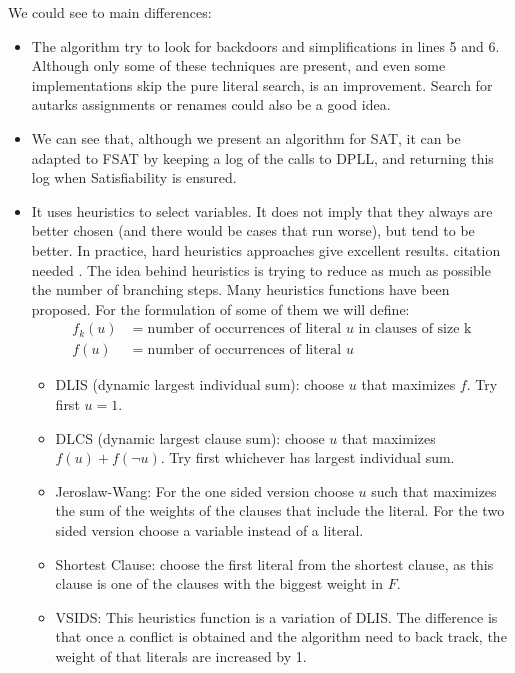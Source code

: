 We could see to main differences:
\begin{itemize}
\item The algorithm try to look for backdoors and simplifications in lines 5 and 6. Although only some of these techniques are present, and even some implementations skip the pure  literal search, is an improvement. Search for autarks assignments or renames could also be a good idea.

\item We can see that, although we present an algorithm for SAT, it can be adapted to FSAT by keeping a log of the calls to DPLL, and returning this log when Satisfiability is ensured.
  
\item It uses heuristics to select variables. It does not imply that they always are better chosen  (and there would be cases that run worse), but tend to be better. In practice, hard heuristics approaches give excellent results. {\color{red} citation needed }. The idea behind heuristics is trying to reduce as much as possible the number of branching steps. Many heuristics functions have been proposed. For the formulation of some of them we will define:
  \begin{equation}
    \begin{split}
      f_k(u) & = \text{number of occurrences of literal } u \text{ in clauses of size k}\\
      f(u) & = \text{number of occurrences of literal } u
\end{split}
\end{equation}
  
  \begin{itemize}
  \item DLIS (dynamic largest individual sum): choose $u$ that maximizes $f$. Try first $u=1$.
  \item DLCS (dynamic largest clause sum):  choose $u$ that maximizes $f(u)+f(\neg u)$. Try first whichever has largest individual sum.
  \item Jeroslaw-Wang: For the one sided version choose $u$ such that maximizes the sum of the weights of the clauses that include the literal. For the two sided version choose a variable instead of a literal.
  \item Shortest Clause: choose the first literal from the shortest clause, as this clause is one of the clauses with the biggest weight in $F$.
  \item VSIDS: This heuristics function is a variation of DLIS. The difference is that once a conflict is obtained and the algorithm need to back track, the weight of that literals are increased by 1.
  \end{itemize}
\end{itemize}

